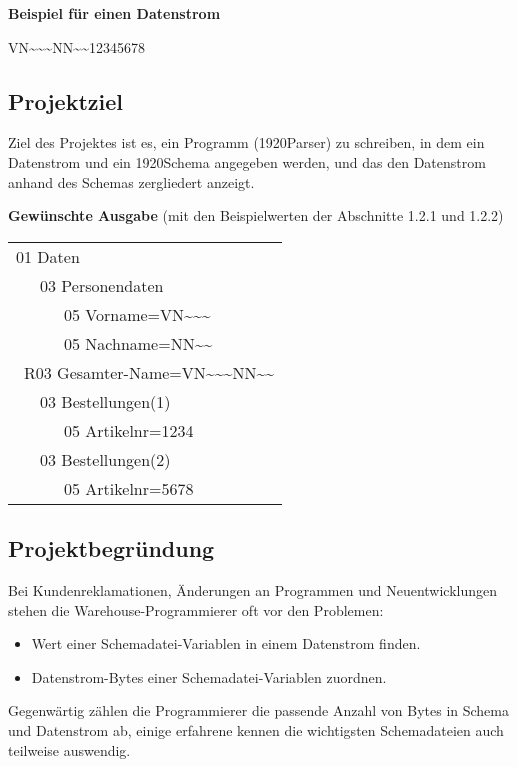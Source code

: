 \textbf{Beispiel für einen Datenstrom}

VN\textasciitilde \textasciitilde \textasciitilde NN\textasciitilde\textasciitilde12345678


\subsection{Projektziel}
\label{sec:Projektziel}
Ziel des Projektes ist es, ein Programm (1920Parser) zu schreiben, in dem ein Datenstrom und ein 1920Schema angegeben werden, und das den Datenstrom anhand des Schemas zergliedert anzeigt.

\textbf{Gewünschte Ausgabe} (mit den Beispielwerten der Abschnitte 1.2.1 und 1.2.2)

\begin{tabularx}{0px}{l}
01 Daten\\
\ \ \ 03 Personendaten\\
\ \ \ \ \ \ 05 Vorname=VN\textasciitilde \textasciitilde \textasciitilde\\
\ \ \ \ \ \ 05 Nachname=NN\textasciitilde \textasciitilde\\
\ R03 Gesamter-Name=VN\textasciitilde \textasciitilde \textasciitilde NN\textasciitilde \textasciitilde\\
\ \ \ 03 Bestellungen(1)\\
\ \ \ \ \ \ 05 Artikelnr=1234\\
\ \ \ 03 Bestellungen(2)\\
\ \ \ \ \ \ 05 Artikelnr=5678\\
\end{tabularx}

\subsection{Projektbegründung}
\label{sec:Projektbegruendung}
Bei Kundenreklamationen, Änderungen an Programmen und Neuentwicklungen stehen die Warehouse-Programmierer oft vor den Problemen:

\begin{itemize}
\item Wert einer Schemadatei-Variablen in einem Datenstrom finden.
\item Datenstrom-Bytes einer Schemadatei-Variablen zuordnen.
\end{itemize}

Gegenwärtig zählen die Programmierer die passende Anzahl von Bytes in Schema und Datenstrom ab, einige erfahrene kennen die wichtigsten Schemadateien auch teilweise auswendig. 


